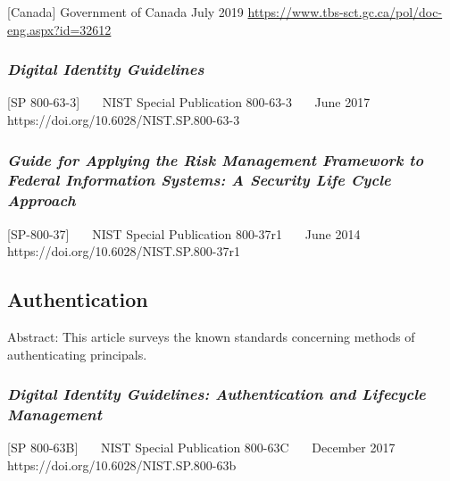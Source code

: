 {[}Canada{]} Government of Canada July 2019
\url{https://www.tbs-sct.gc.ca/pol/doc-eng.aspx?id=32612}

\hypertarget{digital-identity-guidelines}{%
\subsubsection{\texorpdfstring{\emph{Digital Identity
Guidelines}}{Digital Identity Guidelines}}\label{digital-identity-guidelines}}

{[}SP 800-63-3{]}~~~ NIST Special Publication 800-63-3~~~ June 2017~~~
https://doi.org/10.6028/NIST.SP.800-63-3~~~

\hypertarget{guide-for-applying-the-risk-management-framework-to-federal-information-systems-a-security-life-cycle-approach}{%
\subsubsection{\texorpdfstring{\emph{Guide for Applying the Risk Management
Framework to Federal Information Systems: A Security Life Cycle
Approach}}{Guide for Applying the Risk Management Framework to Federal Information Systems: A Security Life Cycle Approach}}\label{guide-for-applying-the-risk-management-framework-to-federal-information-systems-a-security-life-cycle-approach}}

{[}SP-800-37{]}~~~ NIST Special Publication 800-37r1~~~ June 2014~~~
https://doi.org/10.6028/NIST.SP.800-37r1~~~

\hypertarget{authentication-1}{%
\subsection{Authentication}\label{authentication-1}}

Abstract: This article surveys the known standards concerning methods of
authenticating principals.

\hypertarget{digital-identity-guidelines-authentication-and-lifecycle-management}{%
\subsubsection{\texorpdfstring{\emph{Digital Identity Guidelines:
Authentication and Lifecycle
Management}}{Digital Identity Guidelines: Authentication and Lifecycle Management}}\label{digital-identity-guidelines-authentication-and-lifecycle-management}}

{[}SP 800-63B{]}~~~ NIST Special Publication 800-63C~~~ December 2017~~~
https://doi.org/10.6028/NIST.SP.800-63b~~~

